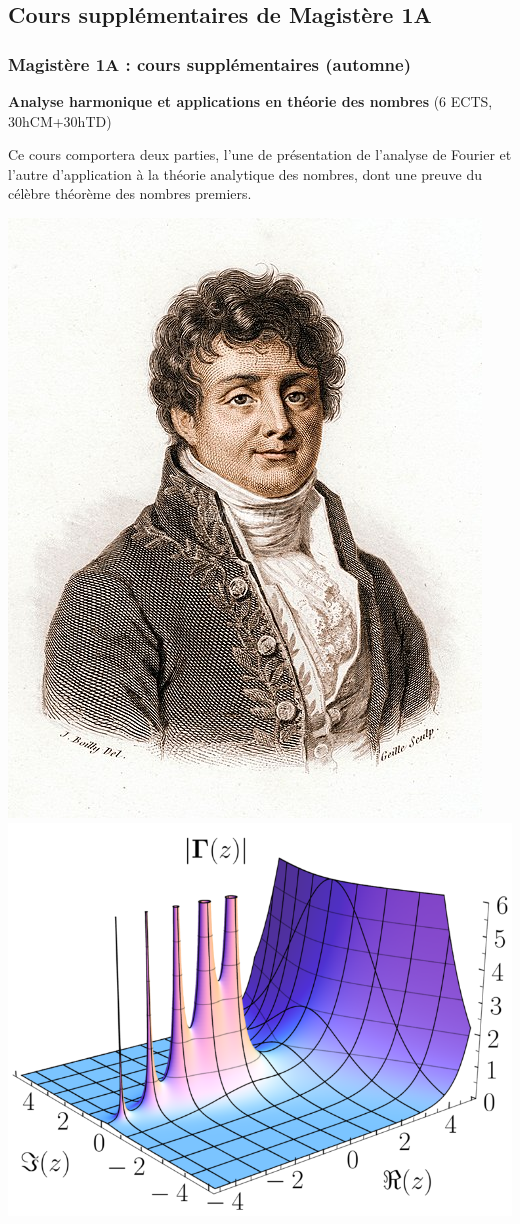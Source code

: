 \documentclass[slidetop,11pt]{beamer}
\begin{document}
\subsection{Cours supplémentaires de Magistère 1A}
\begin{frame}
\frametitle{Magistère 1A : cours supplémentaires (automne)}

\textbf{Analyse harmonique et applications en théorie des nombres} (6 ECTS, 30hCM+30hTD)

Ce cours comportera deux parties, l'une de présentation de l'analyse de Fourier et l'autre d'application à la théorie analytique des nombres, dont une preuve du célèbre théorème des nombres premiers.
\begin{center}
\includegraphics[scale=.2]{images/fourier2.jpg} 
\includegraphics[scale=.2]{images/Gamma_abs_3D.png}

\end{center}
\end{frame}
\end{document}
